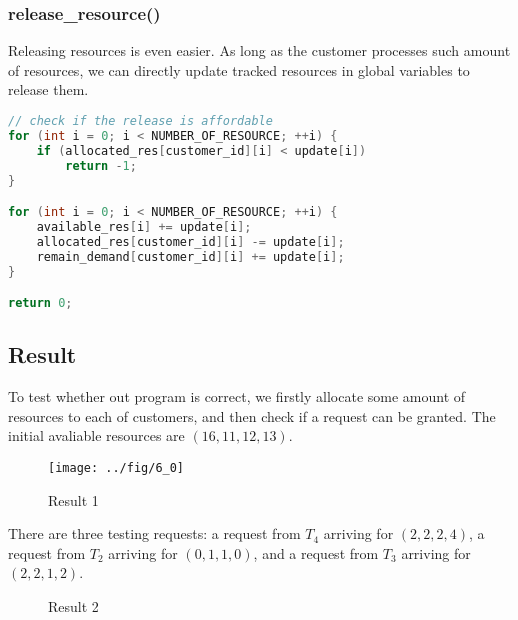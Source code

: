 \documentclass{article}
\begin{document}
\subsubsection*{release\_resource()}
Releasing resources is even easier. As long as the customer processes such amount of resources, we can directly update tracked resources in global variables to release them.

\begin{lstlisting}[language=c, caption={release\_resource()}]
// check if the release is affordable
for (int i = 0; i < NUMBER_OF_RESOURCE; ++i) {
    if (allocated_res[customer_id][i] < update[i])
        return -1;
}

for (int i = 0; i < NUMBER_OF_RESOURCE; ++i) {
    available_res[i] += update[i];
    allocated_res[customer_id][i] -= update[i];
    remain_demand[customer_id][i] += update[i];
}

return 0;
\end{lstlisting}

\subsection*{Result}
To test whether out program is correct, we firstly allocate some amount of resources to each of customers, and then check if a request can be granted. The initial avaliable resources are $(16, 11, 12, 13)$.

\begin{figure}[h]
    \centering
    
    \texttt{[image: ../fig/6\_0]}
    \caption{Result 1}
    \label{6_0}
\end{figure}

There are three testing requests: a request from $T_4$ arriving for $ (2, 2, 2, 4)$, a request from $T_2$ arriving for $(0, 1, 1, 0)$, and a request from $T_3$ arriving for $(2, 2, 1, 2)$.

\begin{figure}[htbp]
    \centering
    
    \caption{Result 2}
    \label{6_1}
\end{figure}
\end{document}
